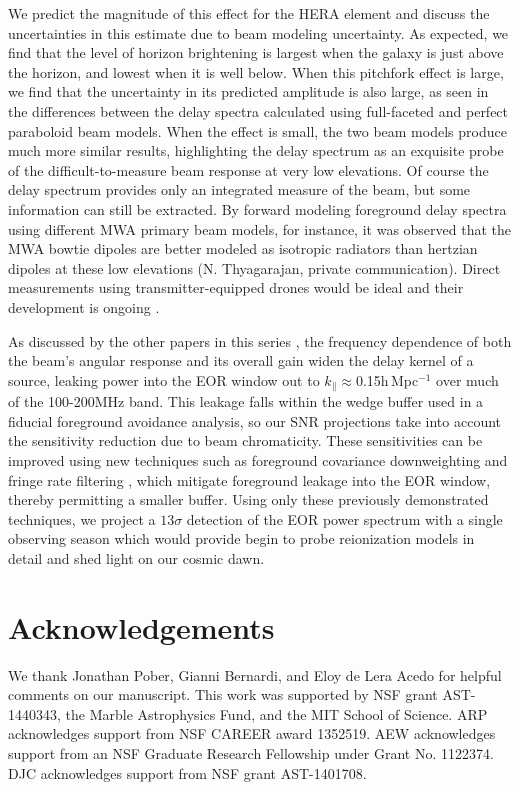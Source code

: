 We predict the magnitude of this effect for the HERA element and discuss the uncertainties in this estimate due to beam modeling uncertainty. As expected, we find that the level of horizon brightening is largest when the galaxy is just above the horizon, and lowest when it is well below. When this pitchfork effect is large, we find that the uncertainty in its predicted amplitude is also large, as seen in the differences between the delay spectra calculated using full-faceted and perfect paraboloid beam models. When the effect is small, the two beam models produce much more similar results, highlighting the delay spectrum as an exquisite probe of the difficult-to-measure beam response at very low elevations. Of course the delay spectrum provides only an integrated measure of the beam, but some information can still be extracted. By forward modeling foreground delay spectra using different MWA primary beam models, for instance, it was observed that the MWA bowtie dipoles are better modeled as isotropic radiators than hertzian dipoles at these low elevations (N. Thyagarajan, private communication). Direct measurements using transmitter-equipped drones would be ideal and their development is ongoing \citep{drone1,drone2}.

As discussed by the other papers in this series \citep{ewallwice16,patra16,nithya16}, the frequency dependence of both the beam's angular response and its overall gain widen the delay kernel of a source, leaking power into the EOR window out to $k_\parallel\approx$0.15h\,Mpc$^{-1}$ over much of the 100-200MHz band. This leakage falls within the wedge buffer used in a fiducial foreground avoidance analysis, so our SNR projections take into account the sensitivity reduction due to beam chromaticity. These sensitivities can be improved using new techniques such as foreground covariance downweighting and fringe rate filtering \citep{ali15,parsonsoptimalfringeratefiltering}, which mitigate foreground leakage into the EOR window, thereby permitting a smaller buffer. Using only these previously demonstrated techniques, we project a $13\sigma$ detection of the EOR power spectrum with a single observing season which would provide begin to probe reionization models in detail and shed light on our cosmic dawn. 


\section*{Acknowledgements}
We thank Jonathan Pober, Gianni Bernardi, and Eloy de Lera Acedo for helpful comments on our manuscript. This work was supported by NSF grant AST-1440343, the Marble Astrophysics Fund, and the MIT School of Science. ARP acknowledges support from NSF CAREER award 1352519. AEW acknowledges support from an NSF Graduate Research Fellowship under Grant No. 1122374. DJC acknowledges support from NSF grant AST-1401708.
